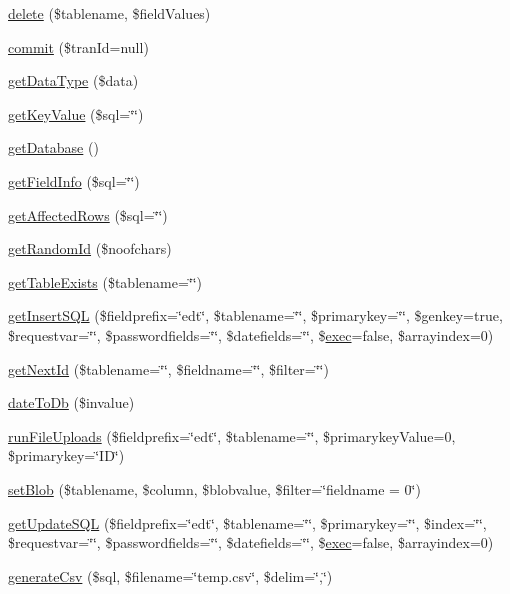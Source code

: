 \begin{DoxyCompactItemize}
\item 
\hyperlink{classDebby_a5d6fa243fcf4b98b0c7d295136a32d5e}{delete} (\$tablename, \$field\+Values)
\item 
\hyperlink{classDebby_abd1a0612de8d8558a155fa40754fb2c6}{commit} (\$tran\+Id=null)
\item 
\hyperlink{classDebby_ac478861de694f44be2d1caceb24b42da}{get\+Data\+Type} (\$data)
\item 
\hyperlink{classDebby_ab7154d566317a9b0d9c2fbc9365b874f}{get\+Key\+Value} (\$sql=\char`\"{}\char`\"{})
\item 
\hyperlink{classDebby_a3db4be991273f352071c85ed7e0ba4ef}{get\+Database} ()
\item 
\hyperlink{classDebby_ad32fa25b945f492253439ed78641d469}{get\+Field\+Info} (\$sql=\char`\"{}\char`\"{})
\item 
\hyperlink{classDebby_a1659291aeee9847ff87329914a8ac695}{get\+Affected\+Rows} (\$sql=\char`\"{}\char`\"{})
\item 
\hyperlink{classDebby_a2d73151aa881a7d42dcdf2cd4fd4f2d8}{get\+Random\+Id} (\$noofchars)
\item 
\hyperlink{classDebby_a40081a8f7b867ea5c145fd1a69312a5c}{get\+Table\+Exists} (\$tablename=\char`\"{}\char`\"{})
\item 
\hyperlink{classDebby_a16d70533ec98b133bbedb916e7599176}{get\+Insert\+S\+Q\+L} (\$fieldprefix=\char`\"{}edt\char`\"{}, \$tablename=\char`\"{}\char`\"{}, \$primarykey=\char`\"{}\char`\"{}, \$genkey=true, \$requestvar=\char`\"{}\char`\"{}, \$passwordfields=\char`\"{}\char`\"{}, \$datefields=\char`\"{}\char`\"{}, \$\hyperlink{classDebby_a246a7d5268c855f26ce31f4088ce56e9}{exec}=false, \$arrayindex=0)
\item 
\hyperlink{classDebby_af7c384f77a1a616e70b936dd536e6657}{get\+Next\+Id} (\$tablename=\char`\"{}\char`\"{}, \$fieldname=\char`\"{}\char`\"{}, \$filter=\char`\"{}\char`\"{})
\item 
\hyperlink{classDebby_a9cb39569856f66218e9f0bd6271c4f64}{date\+To\+Db} (\$invalue)
\item 
\hyperlink{classDebby_a243d5ab95ac9d5857be34a7db4eb6771}{run\+File\+Uploads} (\$fieldprefix=\char`\"{}edt\char`\"{}, \$tablename=\char`\"{}\char`\"{}, \$primarykey\+Value=0, \$primarykey=\char`\"{}I\+D\char`\"{})
\item 
\hyperlink{classDebby_a6a77444ee8c09f53fa741ae96b33e55c}{set\+Blob} (\$tablename, \$column, \$blobvalue, \$filter=\char`\"{}fieldname = 0\char`\"{})
\item 
\hyperlink{classDebby_a3361696a807a1f5a968db4cb6643c8d6}{get\+Update\+S\+Q\+L} (\$fieldprefix=\char`\"{}edt\char`\"{}, \$tablename=\char`\"{}\char`\"{}, \$primarykey=\char`\"{}\char`\"{}, \$index=\char`\"{}\char`\"{}, \$requestvar=\char`\"{}\char`\"{}, \$passwordfields=\char`\"{}\char`\"{}, \$datefields=\char`\"{}\char`\"{}, \$\hyperlink{classDebby_a246a7d5268c855f26ce31f4088ce56e9}{exec}=false, \$arrayindex=0)
\item 
\hyperlink{classDebby_ac947c9394a4bfeda1f81902ffd03aa4c}{generate\+Csv} (\$sql, \$filename=\char`\"{}temp.\+csv\char`\"{}, \$delim=\char`\"{},\char`\"{})
\end{DoxyCompactItemize}

